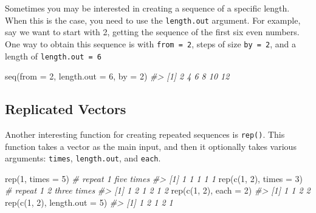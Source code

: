 \documentclass[
]{book}
\newenvironment{Shaded}{\begin{snugshade}}{\end{snugshade}}
\newcommand{\AttributeTok}[1]{\textcolor[rgb]{0.77,0.63,0.00}{#1}}
\newcommand{\CommentTok}[1]{\textcolor[rgb]{0.56,0.35,0.01}{\textit{#1}}}
\newcommand{\DecValTok}[1]{\textcolor[rgb]{0.00,0.00,0.81}{#1}}
\newcommand{\FunctionTok}[1]{\textcolor[rgb]{0.00,0.00,0.00}{#1}}
\newcommand{\NormalTok}[1]{#1}
\begin{document}
Sometimes you may be interested in creating a sequence of a specific length.
When this is the case, you need to use the \texttt{length.out} argument. For example,
say we want to start with 2, getting the sequence of the first six even numbers.
One way to obtain this sequence is with \texttt{from\ =\ 2}, steps of size \texttt{by\ =\ 2},
and a length of \texttt{length.out\ =\ 6}

\begin{Shaded}
\begin{Highlighting}[]
\FunctionTok{seq}\NormalTok{(}\AttributeTok{from =} \DecValTok{2}\NormalTok{, }\AttributeTok{length.out =} \DecValTok{6}\NormalTok{, }\AttributeTok{by =} \DecValTok{2}\NormalTok{)}
\CommentTok{\#\textgreater{} [1]  2  4  6  8 10 12}
\end{Highlighting}
\end{Shaded}

\hypertarget{replicated-vectors}{%
\subsection{Replicated Vectors}\label{replicated-vectors}}

Another interesting function for creating repeated sequences is \texttt{rep()}. This
function takes a vector as the main input, and then it
optionally takes various arguments: \texttt{times}, \texttt{length.out}, and \texttt{each}.

\begin{Shaded}
\begin{Highlighting}[]
\FunctionTok{rep}\NormalTok{(}\DecValTok{1}\NormalTok{, }\AttributeTok{times =} \DecValTok{5}\NormalTok{)        }\CommentTok{\# repeat 1 five times}
\CommentTok{\#\textgreater{} [1] 1 1 1 1 1}
\FunctionTok{rep}\NormalTok{(}\FunctionTok{c}\NormalTok{(}\DecValTok{1}\NormalTok{, }\DecValTok{2}\NormalTok{), }\AttributeTok{times =} \DecValTok{3}\NormalTok{)  }\CommentTok{\# repeat 1 2 three times}
\CommentTok{\#\textgreater{} [1] 1 2 1 2 1 2}
\FunctionTok{rep}\NormalTok{(}\FunctionTok{c}\NormalTok{(}\DecValTok{1}\NormalTok{, }\DecValTok{2}\NormalTok{), }\AttributeTok{each =} \DecValTok{2}\NormalTok{)}
\CommentTok{\#\textgreater{} [1] 1 1 2 2}
\FunctionTok{rep}\NormalTok{(}\FunctionTok{c}\NormalTok{(}\DecValTok{1}\NormalTok{, }\DecValTok{2}\NormalTok{), }\AttributeTok{length.out =} \DecValTok{5}\NormalTok{)}
\CommentTok{\#\textgreater{} [1] 1 2 1 2 1}
\end{Highlighting}
\end{Shaded}
\end{document}
